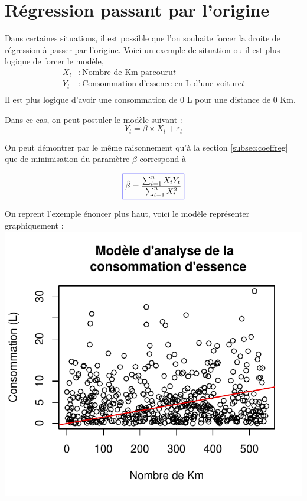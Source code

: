 \documentclass[11pt,french]{report}
\begin{document}
\section{Régression passant par l'origine}
Dans certaines situations, il est possible que l'on souhaite forcer la droite de régression à passer par l'origine.
Voici un exemple de situation ou il est plus logique de forcer le modèle,
\begin{align*}
X_t &: \text{Nombre de Km parcouru} t \\
Y_t &: \text{Consommation d'essence en L d'une voiture} t\\
\end{align*}
Il est plus logique d'avoir une consommation de 0 L pour une distance de 0 Km.

Dans ce cas, on peut postuler le modèle suivant :
\begin{equation}
\label{eq:regzero}
Y_t = \beta \times X_t + \varepsilon_t
\end{equation}

On peut démontrer par le même raisonnement qu'à la section \ref{subsec:coeffreg} que de minimisation du paramètre $\beta$ correspond à 

\begin{equation}
\label{eq:betasimp}
\color{blue}
\boxed{\color{black}
\hat{\beta} = \frac{\sum_{t=1}^n X_t Y_t}{\sum_{t=1}^n X_t^2}}
\end{equation}

On reprent l'exemple énoncer plus haut, voici le modèle représenter graphiquement :
\includegraphics{notes_de_cours-010}
\end{document}

